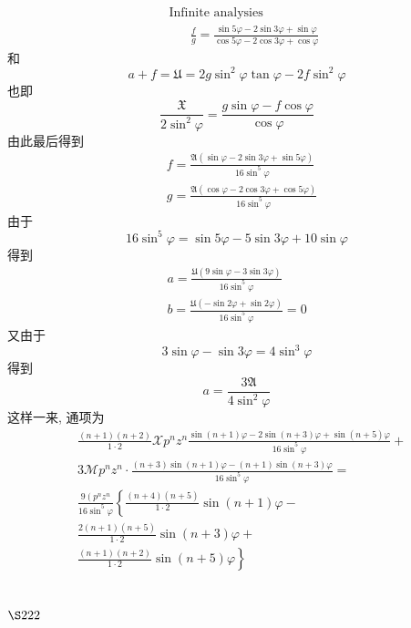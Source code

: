 \[
\begin{aligned}
& \text { Infinite analysies } \\
& \qquad \frac{f}{g}=\frac{\sin 5 \varphi-2 \sin 3 \varphi+\sin \varphi}{\cos 5 \varphi-2 \cos 3 \varphi+\cos \varphi}
\end{aligned}
\]
和
\[
a+f=\mathfrak{U}=2 g \sin ^{2} \varphi \tan \varphi-2 f \sin ^{2} \varphi
\]
也即
\[
\frac{\mathfrak{X}}{2 \sin ^{2} \varphi}=\frac{g \sin \varphi-f \cos \varphi}{\cos \varphi}
\]
由此最后得到
\[
\begin{aligned}
& f=\frac{\mathfrak{A}(\sin \varphi-2 \sin 3 \varphi+\sin 5 \varphi)}{16 \sin ^{5} \varphi} \\
& g=\frac{\mathfrak{A}(\cos \varphi-2 \cos 3 \varphi+\cos 5 \varphi)}{16 \sin ^{5} \varphi}
\end{aligned}
\]
由于
\[
16 \sin ^{5} \varphi=\sin 5 \varphi-5 \sin 3 \varphi+10 \sin \varphi
\]
得到
\[
\begin{gathered}
a=\frac{\mathfrak{U}(9 \sin \varphi-3 \sin 3 \varphi)}{16 \sin ^{5} \varphi} \\
b=\frac{\mathfrak{U}(-\sin 2 \varphi+\sin 2 \varphi)}{16 \sin ^{5} \varphi}=0
\end{gathered}
\]
又由于
\[
3 \sin \varphi-\sin 3 \varphi=4 \sin ^{3} \varphi
\]
得到
\[
a=\frac{3 \mathfrak{A}}{4 \sin ^{2} \varphi}
\]
这样一来, 通项为
\[
\begin{aligned}
& \frac{(n+1)(n+2)}{1 \cdot 2} \mathscr{X} p^{n} z^{n} \frac{\sin (n+1) \varphi-2 \sin (n+3) \varphi+\sin (n+5) \varphi}{16 \sin ^{5} \varphi}+ \\
& 3 \mathscr{M} p^{n} z^{n} \cdot \frac{(n+3) \sin (n+1) \varphi-(n+1) \sin (n+3) \varphi}{16 \sin ^{5} \varphi}= \\
& \frac{9\left(p^{n} z^{n}\right.}{16 \sin ^{5} \varphi}\left\{\frac{(n+4)(n+5)}{1 \cdot 2} \sin (n+1) \varphi-\right. \\
& \frac{2(n+1)(n+5)}{1 \cdot 2} \sin (n+3) \varphi+ \\
& \left.\frac{(n+1)(n+2)}{1 \cdot 2} \sin (n+5) \varphi\right\}
\end{aligned}
\]
\section{$\S 222$}

